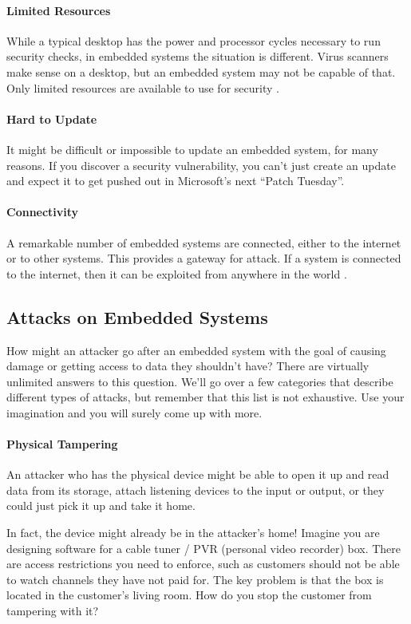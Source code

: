 \paragraph{Limited Resources}
While a typical desktop has the power and processor cycles necessary to run security checks, in embedded systems the situation is different. Virus scanners make sense on a desktop, but an embedded system may not be capable of that. Only limited resources are available to use for security \cite{ess}.

\paragraph{Hard to Update}
It might be difficult or impossible to update an embedded system, for many reasons. If you discover a security vulnerability, you can't just create an update and expect it to get pushed out in Microsoft's next ``Patch Tuesday''.

\paragraph{Connectivity} 
A remarkable number of embedded systems are connected, either to the internet or to other systems. This provides a gateway for attack. If a system is connected to the internet, then it can be exploited from anywhere in the world \cite{ess}.

\subsection*{Attacks on Embedded Systems}
How might an attacker go after an embedded system with the goal of causing damage or getting access to data they shouldn't have? There are virtually unlimited answers to this question. We'll go over a few categories that describe different types of attacks, but remember that this list is not exhaustive. Use your imagination and you will surely come up with more.

\paragraph{Physical Tampering}
An attacker who has the physical device might be able to open it up and read data from its storage, attach listening devices to the input or output, or they could just pick it up and take it home.  

In fact, the device might already be in the attacker's home! Imagine you are designing software for a cable tuner / PVR (personal video recorder) box. There are access restrictions you need to enforce, such as customers should not be able to watch channels they have not paid for. The key problem is that the box is located in the customer's living room. How do you stop the customer from tampering with it?


